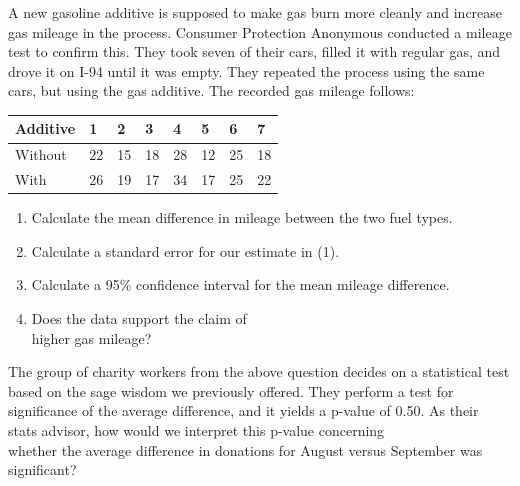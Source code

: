 \documentclass[11pt, chapterprefix=true]{scrbook}\usepackage[]{graphicx}\usepackage[]{color}
\begin{document}
\begin{exercises}
\begin{solution}
\end{solution}

\begin{exercise}  %

A new gasoline additive is supposed to make gas burn more cleanly and increase gas mileage in the process.  Consumer Protection Anonymous conducted a mileage test to confirm this.  They took seven of their cars, filled it with regular gas, and drove it on I-94 until it was empty.  They repeated the process using the same cars, but using the gas additive.  The recorded gas mileage follows:

\begin{tabular}{@{} llllllll @{}} \hline
Additive & 1 & 2 & 3 & 4 & 5 & 6 & 7 \\ \hline
Without & 22 & 15 & 18 & 28 & 12 & 25 & 18 \\
With    & 26 & 19 & 17 & 34 & 17 & 25 & 22 \\ \hline
\end{tabular}

\begin{enumerate}
  \item Calculate the mean difference in mileage between the two fuel types.         \item Calculate a standard error for our estimate in (1).
  \item Calculate a 95\% confidence interval for the mean mileage difference.
  \item Does the data support the claim of \\ higher gas mileage?
\end{enumerate}

\end{exercise}
\begin{solution}  %

\end{solution}

\begin{exercise}  %

The group of charity workers from the above question decides on a statistical test based on the sage wisdom we previously offered. They perform a test for significance of the average difference, and it yields a p-value of 0.50. As their stats advisor, how would we interpret this p-value concerning \\ whether the average difference in donations for August versus September was \\ significant?
\end{exercise}
\begin{solution}  %


\end{solution}
\end{exercises}
\end{document}
